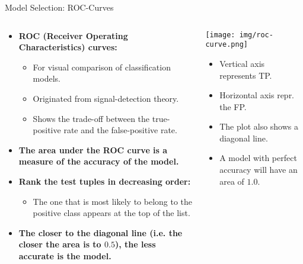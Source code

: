 \begin{frame}{Model Selection: ROC-Curves}
	\begin{columns}
		\begin{column}{0.6\textwidth}
			\begin{itemize}
				\item \textbf{ROC (Receiver Operating Characteristics) curves:}
				      \begin{itemize}
					      \item For visual comparison of classification models.
					      \item Originated from signal-detection theory.
					      \item Shows the trade-off between the true-positive rate and the false-positive rate.
				      \end{itemize}
				\item \textbf{The area under the ROC curve is a {\color{airforceblue}measure of the accuracy} of the model.}
				\item \textbf{{\color{airforceblue}Rank the test tuples} in decreasing order:}
				      \begin{itemize}
					      \item The one that is most likely to belong to the positive class appears at the top of the list.
				      \end{itemize}
				\item \textbf{The closer to the diagonal line (i.e. the closer the area is to $0.5$), the less accurate is the model.}
			\end{itemize}
		\end{column}
		\begin{column}{0.4\textwidth}
			\vspace{-1cm}
			\centering
			\texttt{[image: img/roc-curve.png]}
			\begin{itemize}
				\item Vertical axis represents TP.
				\item Horizontal axis repr. the FP.
				\item The plot also shows a diagonal line.
				\item A model with perfect accuracy will have an area of $1.0$.
			\end{itemize}
		\end{column}
	\end{columns}
\end{frame}

